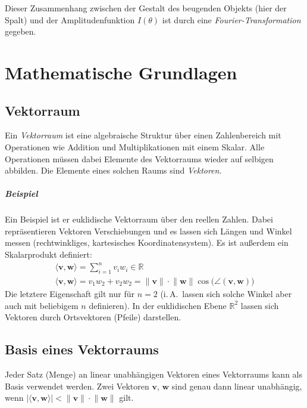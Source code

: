 \documentclass[a4paper, 11pt, accentcolor = tud3b]{tudreport}
\newcommand{\R}{\mathbb{R}}
\renewcommand{\vec}[1]{\boldsymbol{\mathbf{#1}}}
\newcommand{\iA}{i.\,A.~}
\begin{document}
		Dieser Zusammenhang zwischen der Gestalt des beugenden Objekts (hier der Spalt) und der Amplitudenfunktion \( I(\theta) \) ist durch eine \emph{Fourier-Transformation} gegeben.

		\section{Mathematische Grundlagen}
			\subsection{Vektorraum}
				Ein \emph{Vektorraum} ist eine algebraische Struktur über einen Zahlenbereich mit Operationen wie Addition und Multiplikationen mit einem Skalar. Alle Operationen müssen dabei Elemente des Vektorraums wieder auf selbigen abbilden. Die Elemente eines solchen Raums sind \emph{Vektoren}.
				
				\subparagraph{Beispiel}
					Ein Beispiel ist er euklidische Vektorraum über den reellen Zahlen. Dabei repräsentieren Vektoren Verschiebungen und es lassen sich Längen und Winkel messen (rechtwinkliges, kartesisches Koordinatensystem). Es ist außerdem ein Skalarprodukt definiert:
					\begin{gather*}
						\langle \vec{v}, \vec{w} \rangle = \sum_{i = 1}^{n} v_i w_i \in \R \\
						\langle \vec{v}, \vec{w} \rangle = v_1 w_2 + v_2 w_2 = \lVert \vec{v} \rVert \cdot \lVert \vec{w} \rVert \cos \big( \angle(\vec{v}, \vec{w}) \big)
					\end{gather*}
					Die letztere Eigenschaft gilt nur für \( n = 2 \) (\iA lassen sich solche Winkel aber auch mit beliebigem \(n\) definieren). In der euklidischen Ebene \( \R^2 \) lassen sich Vektoren durch Ortsvektoren (Pfeile) darstellen.

			\subsection{Basis eines Vektorraums}
				Jeder Satz (Menge) an linear unabhängigen Vektoren eines Vektorraums kann als Basis verwendet werden. Zwei Vektoren \(\vec{v}\), \(\vec{w}\) sind genau dann linear unabhängig, wenn \( \big\lvert \langle \vec{v}, \vec{w} \rangle \big\rvert < \lVert \vec{v} \rVert \cdot \lVert \vec{w} \rVert \) gilt.
			
\end{document}
